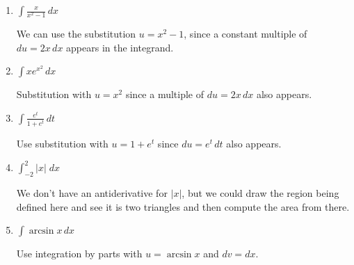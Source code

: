 \documentclass[main]{subfiles}
\begin{document}
\begin{enumerate}
\begin{enumerate}
    \item
    \begin{problem}[\vfill]
        $\displaystyle \int\frac{x}{x^2-1}\,dx$
    \end{problem}

    \begin{solution}
        We can use the substitution $u=x^2-1$, since a constant multiple of 
        $du = 2x\,dx$ appears in the integrand.
    \end{solution}

    \item
    \begin{problem}[\vfill]
        $\displaystyle \int xe^{x^2}\, dx$
    \end{problem}

    \begin{solution}
        Substitution with $u=x^2$ since a multiple of $du = 2x\, dx$ also appears.
    \end{solution}

    \item
    \begin{problem}[\vfill]
        $\displaystyle \int \frac{e^t}{1+e^t}\, dt$
    \end{problem}

    \begin{solution}
        Use substitution with $u=1+e^t$ since $du = e^t\,dt$ also appears.
    \end{solution}

    \item 
    \begin{problem}[\vfill]
        $\displaystyle\int_{-2}^{2} |x|\;dx$
    \end{problem}

    \begin{solution}
        We don't have an antiderivative for $|x|$, but we could draw the region being defined here and see it is two triangles and then compute the area from there.
    \end{solution}

    \item
    \begin{problem}[\vfill\newpage]
        $\displaystyle \int \arcsin x \, dx$
    \end{problem}

    \begin{solution}
        Use integration by parts with $u=\arcsin x$ and $dv = dx$. 
    \end{solution}
\end{enumerate}


\end{enumerate}
\end{document}
